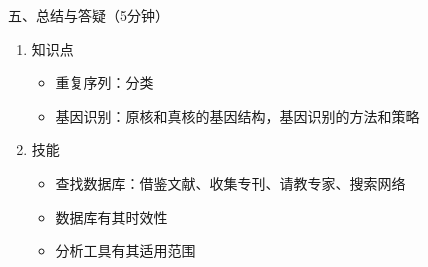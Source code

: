 \documentclass{TIJMUjiaoanLL}
\begin{document}
\vspace*{0.2cm}
\noindent
五、总结与答疑（5分钟）
\begin{enumerate}
  \item 知识点
    \begin{itemize}
      \item 重复序列：分类
      \item 基因识别：原核和真核的基因结构，基因识别的方法和策略
    \end{itemize}
  \item 技能
    \begin{itemize}
      \item 查找数据库：借鉴文献、收集专刊、请教专家、搜索网络
      \item 数据库有其时效性
      \item 分析工具有其适用范围
    \end{itemize}
\end{enumerate}


\otherTail
\end{document}
